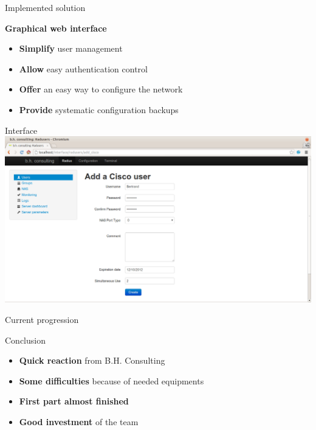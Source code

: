 \documentclass[12pt]{beamer}
\begin{document}
\begin{frame}{Implemented solution}
    \begin{center}
    \textbf{Graphical web interface}
    \end{center}

    \pause
    \begin{itemize}[<+->]\vfill
	\item \textbf{Simplify} user management\vfill
	\item \textbf{Allow} easy authentication control\vfill
	\item \textbf{Offer} an easy way to configure the network\vfill
    	\item \textbf{Provide} systematic configuration backups\vfill
    \end{itemize}
    \vfill
\end{frame}
	
\begin{frame}{Interface}
    \includegraphics[width=\textwidth]{img/capture1.png}
\end{frame}

\begin{frame}{Current progression}
\end{frame}

\begin{frame}{Conclusion}
    \begin{itemize}
	\item \textbf{Quick reaction} from B.H. Consulting
	\vfill
	\item \textbf{Some difficulties} because of needed equipments
	\vfill
	\item \textbf{First part almost finished}
	\vfill
	\item \textbf{Good investment} of the team
    \end{itemize}
\end{frame}
\end{document}
